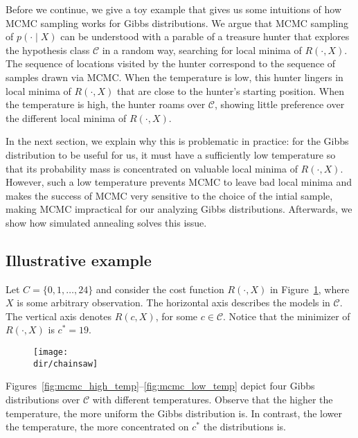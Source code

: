 Before we continue, we give a toy example that gives us some intuitions
of how MCMC sampling works for Gibbs distributions. We argue that
MCMC sampling of $p(\cdot \mid X)$ can be understood with a parable of a treasure
hunter that explores the hypothesis class $\mathcal{C}$ in a random way, searching
for local minima of $R(\cdot, X)$. The sequence of locations visited by the hunter
correspond to the sequence of samples drawn via MCMC. When the temperature
is low, this hunter lingers in local minima of $R(\cdot, X)$ that are close
to the hunter's starting position. When the temperature is high, the hunter
roams over $\mathcal{C}$, showing little preference over the different local minima of $R(\cdot, X)$.

In the next section, we explain why this is problematic in practice: for
the Gibbs distribution to be useful for us, it must have a sufficiently low
temperature so that its probability mass is concentrated on valuable local
minima of $R(\cdot, X)$. However, such a low temperature prevents MCMC to
leave bad local minima and makes the success of MCMC very sensitive to
the choice of the intial sample, making MCMC impractical for our analyzing
Gibbs distributions. Afterwards, we show how simulated annealing solves
this issue.

\subsection{Illustrative example}

Let $C = \{0, 1, \ldots, 24\}$ and consider the cost function $R(\cdot, X)$ in Figure~\ref{fig:chainsaw_sa},
where $X$ is some arbitrary observation. The horizontal axis describes the
models in $\mathcal{C}$. The vertical axis denotes $R(c, X)$, for some $c \in \mathcal{C}$. Notice
that the minimizer of $R(\cdot, X)$ is $c^* = 19$.

\begin{figure}
\centering
\texttt{[image: \\dir/chainsaw]}
\caption{}
\label{fig:chainsaw_sa}
\end{figure}

Figures~\ref{fig:mcmc_high_temp}--\ref{fig:mcmc_low_temp} depict four Gibbs distributions over $\mathcal{C}$ with different
temperatures. Observe that the higher the temperature, the more uniform
the Gibbs distribution is. In contrast, the lower the temperature, the more
concentrated on $c^*$ the distributions is.

